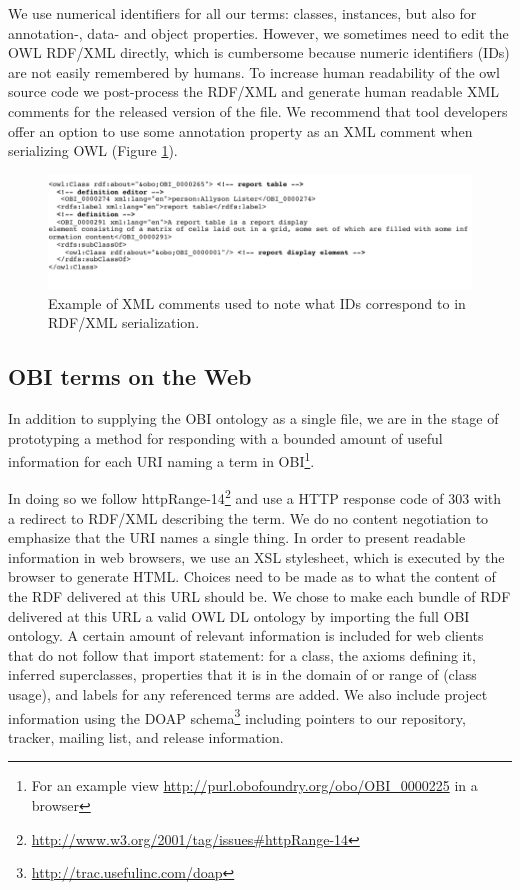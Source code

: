 \documentclass{elsart}       %
\begin{document}
We use numerical identifiers for all our terms: classes, instances, but also for annotation-, data- and object properties.
However, we sometimes need to edit the OWL RDF/XML directly, which is cumbersome because numeric identifiers (IDs) are not easily remembered by humans.
To increase human readability of the owl source code we post-process the RDF/XML and generate human readable XML comments for the released version of the file.
We recommend that tool developers offer an option to use some annotation property as an XML comment when serializing OWL (Figure \ref{fig:comments}).  

\begin{figure}[t]
\centering \includegraphics*[width=1\columnwidth]{comments}
\caption{Example of XML comments used to note what IDs correspond to in RDF/XML serialization.}
\label{fig:comments}
\end{figure}



\subsection{OBI terms on the Web}

In addition to supplying the OBI ontology as a single file, we are in the stage of prototyping a method for responding with a bounded amount of useful information for each URI naming a term in OBI\footnote{For an example view \url{http://purl.obofoundry.org/obo/OBI_0000225} in a browser}.

In doing so we follow httpRange-14\footnote{\url{http://www.w3.org/2001/tag/issues#httpRange-14}} and use a HTTP response code of 303 with a redirect to RDF/XML describing the term.
We do no content negotiation to emphasize that the URI names a single thing.
In order to present readable information in web browsers, we use an XSL stylesheet, which is executed by the browser to generate HTML.
Choices need to be made as to what the content of the RDF delivered at this URL should be.
We chose to make each bundle of RDF delivered at this URL a valid OWL DL ontology by importing the full OBI ontology.
A certain amount of relevant information is included for web clients that do not follow that import statement: for a class, the axioms defining it, inferred superclasses, properties that it is in the domain of or range of (class usage), and labels for any referenced terms are added.
We also include project information using the DOAP schema\footnote{\url{http://trac.usefulinc.com/doap}} including pointers to our repository, tracker, mailing list, and release information. 
\end{document}
